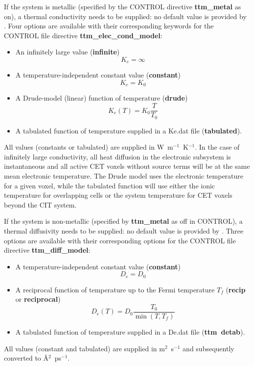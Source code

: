 If the system is metallic (specified by the CONTROL directive {\bf ttm\_metal} as on),
a thermal conductivity
needs to be supplied: no default value is provided by \D.
Four options are available with their corresponding keywords for the CONTROL file 
directive {\bf ttm\_elec\_cond\_model}:
\begin{itemize}
\item An infinitely large value ({\bf infinite}) \begin{equation*}K_e = \infty\end{equation*}
\item A temperature-independent constant value  ({\bf constant}) \begin{equation*}K_e = K_0\end{equation*}
\item A Drude-model (linear) function of temperature ({\bf drude}) \begin{equation*}K_e (T) = K_0 \frac{T}{T_0}\end{equation*}
\item A tabulated function of temperature supplied in a Ke.dat file ({\bf tabulated}).
\end{itemize}
All values (constants or tabulated) are supplied in W~m$^{-1}$~K$^{-1}$.
In the case of infinitely large conductivity, all heat diffusion in the electronic
subsystem is instantaneous and all active CET voxels without source terms
will be at the same mean electronic temperature. The Drude model uses the
electronic temperature for a given voxel, while the tabulated function will use
either the ionic temperature for overlapping cells or the system temperature
for CET voxels beyond the CIT system.

If the system is non-metallic (specified by {\bf ttm\_metal} as off in CONTROL),
a thermal diffusivity
needs to be supplied: no default value is provided by \D.
Three options are available with their corresponding options for the CONTROL 
file directive {\bf ttm\_diff\_model}:
\begin{itemize}
\item A temperature-independent constant value ({\bf constant}) \begin{equation*}D_e = D_0\end{equation*}
\item A reciprocal function of temperature up to the Fermi temperature $T_{f}$ ({\bf recip} or {\bf reciprocal}) \begin{equation*}D_e (T) = D_0 \frac{T_0}{\min \left(T, T_{f}\right)}\end{equation*}
\item A tabulated function of temperature supplied in a De.dat file ({\bf ttm~detab}).
\end{itemize}
All values (constant and tabulated) are supplied in m$^2$~s$^{-1}$ and
subsequently converted to \AA$^2$~ps$^{-1}$.

